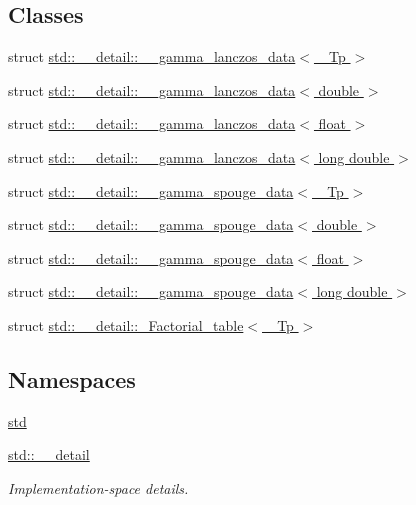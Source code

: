\subsection*{Classes}
\begin{DoxyCompactItemize}
\item 
struct \hyperlink{structstd_1_1____detail_1_1____gamma__lanczos__data}{std\+::\+\_\+\+\_\+detail\+::\+\_\+\+\_\+gamma\+\_\+lanczos\+\_\+data$<$ \+\_\+\+Tp $>$}
\item 
struct \hyperlink{structstd_1_1____detail_1_1____gamma__lanczos__data_3_01double_01_4}{std\+::\+\_\+\+\_\+detail\+::\+\_\+\+\_\+gamma\+\_\+lanczos\+\_\+data$<$ double $>$}
\item 
struct \hyperlink{structstd_1_1____detail_1_1____gamma__lanczos__data_3_01float_01_4}{std\+::\+\_\+\+\_\+detail\+::\+\_\+\+\_\+gamma\+\_\+lanczos\+\_\+data$<$ float $>$}
\item 
struct \hyperlink{structstd_1_1____detail_1_1____gamma__lanczos__data_3_01long_01double_01_4}{std\+::\+\_\+\+\_\+detail\+::\+\_\+\+\_\+gamma\+\_\+lanczos\+\_\+data$<$ long double $>$}
\item 
struct \hyperlink{structstd_1_1____detail_1_1____gamma__spouge__data}{std\+::\+\_\+\+\_\+detail\+::\+\_\+\+\_\+gamma\+\_\+spouge\+\_\+data$<$ \+\_\+\+Tp $>$}
\item 
struct \hyperlink{structstd_1_1____detail_1_1____gamma__spouge__data_3_01double_01_4}{std\+::\+\_\+\+\_\+detail\+::\+\_\+\+\_\+gamma\+\_\+spouge\+\_\+data$<$ double $>$}
\item 
struct \hyperlink{structstd_1_1____detail_1_1____gamma__spouge__data_3_01float_01_4}{std\+::\+\_\+\+\_\+detail\+::\+\_\+\+\_\+gamma\+\_\+spouge\+\_\+data$<$ float $>$}
\item 
struct \hyperlink{structstd_1_1____detail_1_1____gamma__spouge__data_3_01long_01double_01_4}{std\+::\+\_\+\+\_\+detail\+::\+\_\+\+\_\+gamma\+\_\+spouge\+\_\+data$<$ long double $>$}
\item 
struct \hyperlink{structstd_1_1____detail_1_1__Factorial__table}{std\+::\+\_\+\+\_\+detail\+::\+\_\+\+Factorial\+\_\+table$<$ \+\_\+\+Tp $>$}
\end{DoxyCompactItemize}
\subsection*{Namespaces}
\begin{DoxyCompactItemize}
\item 
 \hyperlink{namespacestd}{std}
\item 
 \hyperlink{namespacestd_1_1____detail}{std\+::\+\_\+\+\_\+detail}
\begin{DoxyCompactList}\small\item\em Implementation-\/space details. \end{DoxyCompactList}\end{DoxyCompactItemize}
